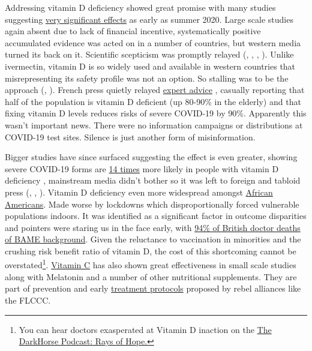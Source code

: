 \documentclass[11pt,a4paper,notitlepage]{report}
\begin{document}
Addressing vitamin D deficiency showed great promise with many studies suggesting \href{https://c19vitamind.com/}{very significant effects} as early as summer 2020. Large scale studies again absent due to lack of financial incentive, systematically positive accumulated evidence was acted on in a number of countries, but western media turned its back on it. Scientific scepticism was promptly relayed (\cite{guardian29062020}, \cite{guardian29032021}, \cite{bbc17112020}, \cite{quechoisir29012021}). Unlike ivermectin, vitamin D is so widely used and available in western countries that misrepresenting its safety profile was not an option. So stalling was to be the approach (\cite{bbc05042021}, \cite{guardian29022021}). French press quietly relayed \href{https://www.franceinter.fr/covid-19-73-experts-lancent-un-appel-pour-qu-on-donne-de-la-vitamine-d-a-la-population-francaise}{expert advice} \cite{franceinter19012021}, casually reporting that half of the population is vitamin D deficient (up 80-90\% in the elderly) and that fixing vitamin D levels reduces risks of severe COVID-19 by 90\%. Apparently this wasn't important news. There were no information campaigns or distributions at COVID-19 test sites. Silence is just another form of misinformation.

Bigger studies have since surfaced suggesting the effect is even greater, showing severe COVID-19 forms are \href{https://journals.plos.org/plosone/article?id=10.1371/journal.pone.0263069}{14 times} more likely in people with vitamin D deficiency \cite{10.1371/journal.pone.0263069}, mainstream media didn't bother so it was left to foreign and tabloid press (\cite{timesofisrael03022022}, \cite{dailymail08022022}, \cite{hindustantimes14022022}). Vitamin D deficiency even more widespread amongst \href{https://www.everydayhealth.com/vitamin-d/does-vitamin-d-deficiency-pose-a-special-risk-for-black-people}{African Americans}. Made worse by lockdowns which disproportionally forced vulnerable populations indoors. It was identified as a significant factor in outcome disparities \cite{Ames2021-sf} and pointers were staring us in the face early, with \href{https://twitter.com/TheBMA/status/1271768163630428160?s=20}{94\% of British doctor deaths of BAME background}. Given the reluctance to vaccination in minorities and the crushing risk benefit ratio of vitamin D, the cost of this shortcoming cannot be overstated\footnote{You can hear doctors exasperated at Vitamin D inaction on the \href{https://open.spotify.com/episode/4BXJgl3LYVez6CrDTbkwOl?si=SYGoeHpzT36LSOsEaQ4jXg}{The DarkHorse Podcast: Rays of Hope.}}. \href{https://nutritionj.biomedcentral.com/articles/10.1186/s12937-021-00727-z}{Vitamin C} has also shown great effectiveness in small scale studies \cite{irriguible2021} along with Melatonin \cite{Cross2021-bl} and a number of other nutritional supplements. They are part of prevention and early \href{https://covid19criticalcare.com/wp-content/uploads/2020/11/FLCCC-Alliance-I-MASKplus-Protocol-ENGLISH.pdf}{treatment protocols} \cite{flccc-imask} proposed by rebel alliances like the FLCCC.
\end{document}
